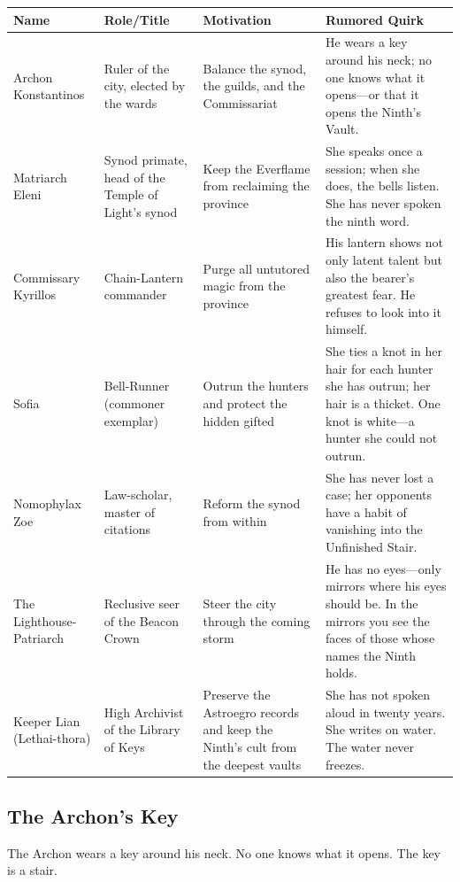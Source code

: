 \begin{longtable}{|p{}|p{}|p{}|p{}|}
\hline
\textbf{Name} & \textbf{Role/Title} & \textbf{Motivation} & \textbf{Rumored Quirk} \\
\hline
Archon Konstantinos & Ruler of the city, elected by the wards & Balance the synod, the guilds, and the Commissariat & He wears a key around his neck; no one knows what it opens---or that it opens the Ninth's Vault. \\
\hline
Matriarch Eleni & Synod primate, head of the Temple of Light's synod & Keep the Everflame from reclaiming the province & She speaks once a session; when she does, the bells listen. She has never spoken the ninth word. \\
\hline
Commissary Kyrillos & Chain-Lantern commander & Purge all untutored magic from the province & His lantern shows not only latent talent but also the bearer's greatest fear. He refuses to look into it himself. \\
\hline
Sofia & Bell-Runner (commoner exemplar) & Outrun the hunters and protect the hidden gifted & She ties a knot in her hair for each hunter she has outrun; her hair is a thicket. One knot is white---a hunter she could not outrun. \\
\hline
Nomophylax Zoe & Law-scholar, master of citations & Reform the synod from within & She has never lost a case; her opponents have a habit of vanishing into the Unfinished Stair. \\
\hline
The Lighthouse-Patriarch & Reclusive seer of the Beacon Crown & Steer the city through the coming storm & He has no eyes---only mirrors where his eyes should be. In the mirrors you see the faces of those whose names the Ninth holds. \\
\hline
Keeper Lian (Lethai-thora) & High Archivist of the Library of Keys & Preserve the Astroegro records and keep the Ninth's cult from the deepest vaults & She has not spoken aloud in twenty years. She writes on water. The water never freezes. \\
\hline
\end{longtable}

\subsection*{The Archon's Key}
\label{sec:thepyrgos-archon-key}

The Archon wears a key around his neck. No one knows what it opens. The key is a stair.

